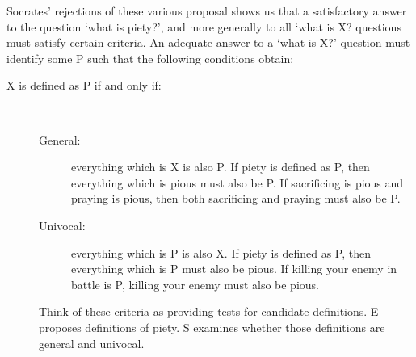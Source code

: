 \documentclass[oneside]{article}
\begin{document}
Socrates' rejections of these various proposal shows us that a satisfactory answer to the question `what is piety?', and more generally to all `what is X? questions must satisfy certain criteria. An adequate answer to a `what is X?' question must identify some P such that the following conditions obtain:
\begin{description}
\item[ X is defined as P if and only if:]\
\begin{description}
\item[General:] everything which is X is also P. If piety is defined as P, then everything which is pious must also be P. If sacrificing is pious and praying is pious, then both sacrificing and praying must also be P. 
\item[Univocal:] everything which is P is also X. If piety is defined as P, then everything which is P must also be pious. If killing your enemy in battle is P, killing your enemy must also be pious. 

\end{description}
Think of these criteria as providing tests for candidate definitions. E proposes definitions of piety. S examines whether those definitions are general and univocal. 










\end{description}
\end{document}

